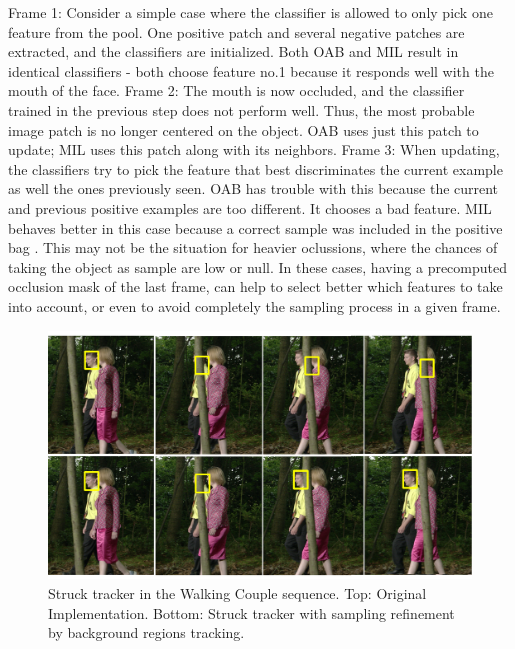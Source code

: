 Frame 1: Consider a simple case where the classiﬁer is allowed
to only pick one feature from the pool. One positive patch and several negative patches  are extracted, and 
the classiﬁers are initialized. Both OAB and MIL result in identical classiﬁers - both choose feature no.1 because it responds well with the mouth of
the face. Frame 2: The mouth is now occluded, and the classiﬁer trained in the previous step does not perform well. Thus, the most probable image patch is no
longer centered on the object. OAB uses just this patch to update; MIL uses this patch along with its neighbors. Frame 3: When updating, the classiﬁers try to pick the feature that best discriminates the current example as well
the ones previously seen. OAB has trouble with this because the current and previous positive examples are too different. It chooses a bad feature.
MIL behaves better in this case because a correct sample was included in the positive bag \cite{c25}. This may not be the situation for heavier oclussions, where the chances of taking the object as sample are low or null. In these cases, having a precomputed occlusion mask of the last frame, 
can help to select better which features to take into account, or even to avoid completely the sampling process in a given frame. 

   \begin{figure}[thpb]
      \centering
      \includegraphics[width=1.0\textwidth]{../images/struckComp.png}
      \caption{Struck tracker in the Walking Couple sequence. Top: Original Implementation. Bottom: Struck tracker with sampling refinement by background regions tracking.}
      \label{tr_strucktest}
   \end{figure}
   
